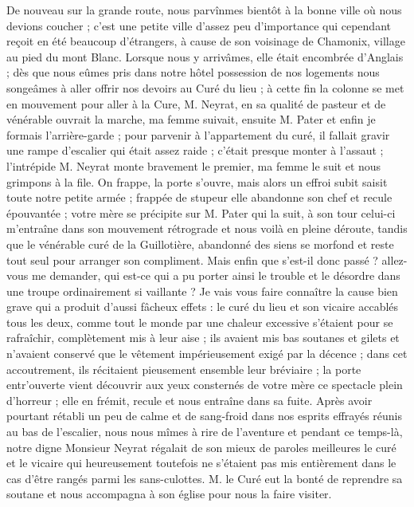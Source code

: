 \documentclass[11pt,a4paper]{report}
\begin{document}
De nouveau sur la grande route, nous parvînmes bientôt à la bonne ville où nous devions coucher ; c'est une petite ville d'assez peu d'importance qui cependant reçoit en été beaucoup d'étrangers, à cause de son voisinage de Chamonix, village au pied du mont Blanc. Lorsque nous y arrivâmes, elle était encombrée d'Anglais ; dès que nous eûmes pris dans notre hôtel possession de nos logements nous songeâmes à aller offrir nos devoirs au Curé du lieu ; à cette fin la colonne se met en mouvement pour aller à la Cure, M. Neyrat, en sa qualité de pasteur et de vénérable ouvrait la marche, ma femme suivait, ensuite M. Pater et enfin je formais l'arrière-garde ; pour parvenir à l'appartement du curé, il fallait gravir une rampe d'escalier qui était assez raide ; c'était presque monter à l'assaut ; l'intrépide M. Neyrat monte bravement le premier, ma femme le suit et nous grimpons à la file. On frappe, la porte s'ouvre, mais alors un effroi subit saisit toute notre petite armée ; frappée de stupeur elle abandonne son chef et recule épouvantée ; votre mère se précipite sur M. Pater qui la suit, à son tour celui-ci m'entraîne dans son mouvement rétrograde et nous voilà en pleine déroute, tandis que le vénérable curé de la Guillotière, abandonné des siens se morfond et reste tout seul pour arranger son compliment. Mais enfin que s'est-il donc passé ? allez-vous me demander, qui est-ce qui a pu porter ainsi le trouble et le désordre dans une troupe ordinairement si vaillante ? Je vais vous faire connaître la cause bien grave qui a produit d'aussi fâcheux effets : le curé du lieu et son vicaire accablés tous les deux, comme tout le monde par une chaleur excessive s'étaient pour se rafraîchir, complètement mis à leur aise ; ils avaient mis bas soutanes et gilets et n'avaient conservé que le vêtement impérieusement exigé par la décence ; dans cet accoutrement, ils récitaient pieusement ensemble leur bréviaire ; la porte entr'ouverte vient découvrir aux yeux consternés de votre mère ce spectacle plein d'horreur ; elle en frémit, recule et nous entraîne dans sa fuite. Après avoir pourtant rétabli un peu de calme et de sang-froid dans nos esprits effrayés réunis au bas de l'escalier, nous nous mîmes à rire de l'aventure et pendant ce temps-là, notre digne Monsieur Neyrat régalait de son mieux de paroles meilleures le curé et le vicaire qui heureusement toutefois ne s'étaient pas mis entièrement dans le cas d'être rangés parmi les sans-culottes. M. le Curé eut la bonté de reprendre sa soutane et nous accompagna à son église pour nous la faire visiter.
\end{document}
